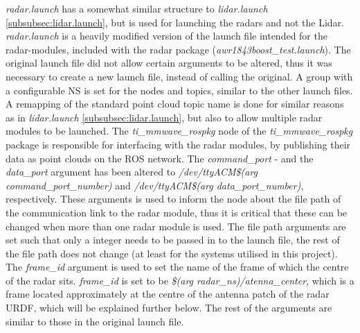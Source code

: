 \label{subsubsec:radar.launch}
\textit{radar.launch} has a somewhat similar structure to \textit{lidar.launch} \ref{subsubsec:lidar.launch}, but is used for launching the radars and not the Lidar. \textit{radar.launch} is a heavily modified version of the launch file intended for the radar-modules, included with the radar package (\textit{awr1843boost\_test.launch}). The original launch file did not allow certain arguments to be altered, thus it was necessary to create a new launch file, instead of calling the original. A group with a configurable NS is set for the nodes and topics, similar to the other launch files. A remapping of the standard point cloud topic name is done for similar reasons as in \textit{lidar.launch} \ref{subsubsec:lidar.launch}, but also to allow multiple radar modules to be launched. The \textit{ti\_mmwave\_rospkg} node of the \textit{ti\_mmwave\_rospkg} package is responsible for interfacing with the radar modules, by publishing their data as point clouds on the ROS network. The \textit{command\_port} - and the \textit{data\_port} argument has been altered to \textit{/dev/ttyACM\$(arg command\_port\_number)} and \textit{/dev/ttyACM\$(arg data\_port\_number)}, respectively. These arguments is used to inform the node about the file path of the communication link to the radar module, thus it is critical that these can be changed when more than one radar module is used. The file path arguments are set such that only a integer needs to be passed in to the launch file, the rest of the file path does not change (at least for the systems utilised in this project). The \textit{frame\_id} argument is used to set the name of the frame of which the centre of the radar sits. \textit{frame\_id} is set to be \textit{\$(arg radar\_ns)/atenna\_center}, which is a frame located approximately at the centre of the antenna patch of the radar URDF, which will be explained further below. The rest of the arguments are similar to those in the original launch file. 

